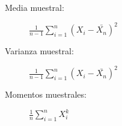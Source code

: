 \documentclass{article}
\begin{document}
\begin{description}
	\item[Media muestral:] $\frac{1}{n-1}\sum_{i=1}^n (X_i-\bar{X_n})^2$
	\item[Varianza muestral:] $\frac{1}{n-1} \sum_{i=1}^n (X_i-\bar{X_n})^2$
	\item[Momentos muestrales:] $\frac{1}{n} \sum_{i=1}^n X_i^k$
\end{description}
\end{document}
